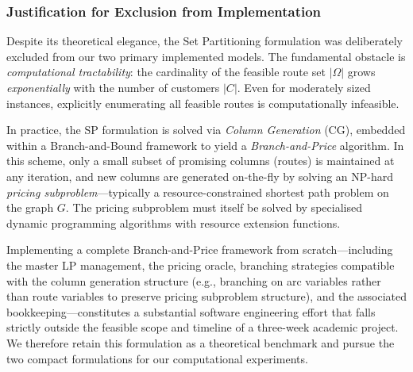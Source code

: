 \documentclass[11pt,a4paper]{article}
\begin{document}
\subsubsection{Justification for Exclusion from Implementation}

Despite its theoretical elegance, the Set Partitioning formulation was deliberately excluded from our two primary implemented models. The fundamental obstacle is \emph{computational tractability}: the cardinality of the feasible route set $|\Omega|$ grows \emph{exponentially} with the number of customers $|C|$. Even for moderately sized instances, explicitly enumerating all feasible routes is computationally infeasible.

In practice, the SP formulation is solved via \emph{Column Generation} (CG), embedded within a Branch-and-Bound framework to yield a \emph{Branch-and-Price} algorithm. In this scheme, only a small subset of promising columns (routes) is maintained at any iteration, and new columns are generated on-the-fly by solving an NP-hard \emph{pricing subproblem}---typically a resource-constrained shortest path problem on the graph $G$. The pricing subproblem must itself be solved by specialised dynamic programming algorithms with resource extension functions.

Implementing a complete Branch-and-Price framework from scratch---including the master LP management, the pricing oracle, branching strategies compatible with the column generation structure (e.g., branching on arc variables rather than route variables to preserve pricing subproblem structure), and the associated bookkeeping---constitutes a substantial software engineering effort that falls strictly outside the feasible scope and timeline of a three-week academic project. We therefore retain this formulation as a theoretical benchmark and pursue the two compact formulations for our computational experiments.
\end{document}
